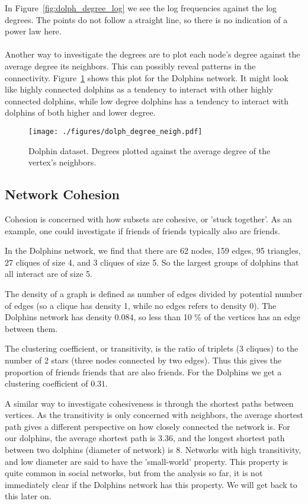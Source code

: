 \documentclass[11pt,a4paper]{article}
\begin{document}
In Figure~\ref{fig:dolph_degree_log} we see the log frequencies against the log degrees. The points do not follow a straight line, so there is no indication of a power law here.
\\
\\
Another way to investigate the degrees are to plot each node's degree against the average degree its neighbors. This can possibly reveal patterns in the connectivity. 
Figure~\ref{fig:dolph_degree_neigh} shows this plot for the Dolphins network. 
It might look like highly connected dolphins as a tendency to interact with other highly connected dolphins, while low degree dolphins has a tendency to interact with dolphins of both higher and lower degree.
%
\begin{figure}[htbp]
    \begin{center}
        \texttt{[image: ./figures/dolph\_degree\_neigh.pdf]}
    \end{center}
    \caption{Dolphin dataset. Degrees plotted against the average degree of the vertex's neighbors.}
    \label{fig:dolph_degree_neigh}
\end{figure}

\subsection{Network Cohesion}
Cohesion is concerned with how subsets are cohesive, or 'stuck together'. As an example, one could investigate if friends of friends typically also are friends.

In the Dolphins network, we find that there are 62 nodes,  159 edges, 95 triangles, 27 cliques of size 4, and  3 cliques of size 5. So the largest groups of dolphins that all interact are of size 5.

The density of a graph is defined as number of edges divided by potential number of edges (so a clique has density 1, while no edges refers to density 0). The Dolphins network has density $0.084$, so less than 10 \% of the vertices has an edge between them.

The clustering coefficient, or transitivity, is the ratio of triplets (3 cliques) to the number of 2 stars (three nodes connected by two edges). Thus this gives the proportion of friends friends that are also friends.
For the Dolphins we get a clustering coefficient of $0.31$.

A similar way to investigate cohesiveness is through the shortest paths between vertices. As the transitivity is only concerned with neighbors, the average shortest path gives a different perspective on how closely connected the network is. 
For our dolphins, the average shortest path is 3.36, and the longest shortest path between two dolphins (diameter of network) is 8. Networks with high transitivity, and low diameter are said to have the 'small-world' property. This property is quite common in social networks, but from the analysis so far, it is not immediately clear if the Dolphins network has this property. We will get back to this later on.
\end{document}

